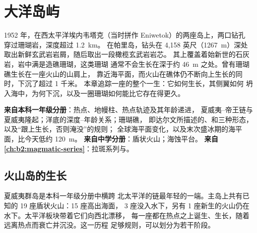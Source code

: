 \chapter{大洋岛屿}\label{ch:b2:oceanic-islands}

1952 年，在西太平洋埃内韦塔克（当时拼作 Eniwetok）的两座岛上，两口钻孔
穿过珊瑚岩，深度超过 \qty{1.2}{km}。
在帕里岛，钻头在 4,158 英尺（\qty{1267}{m}）深处取出新鲜玄武岩岩屑，随后取出一段橄榄玄武岩岩芯。
其上覆盖着始新世的石灰岩，岩中满是造礁珊瑚，这类珊瑚
通常不会生长在深于约 \qty{46}{m} 之处。曾有珊瑚礁生长在一座火山的山肩上，
靠近海平面，而火山在礁体仍不断向上生长的同时，下沉了超过 1 千米。
本章追踪一座的整个一生：它如何生长，其侧翼如何
坍入海中，为何下沉，以及一圈珊瑚如何能比它存在得更久。

\begin{recall}
\textbf{来自本科一年级分册}：热点、地幔柱、热点轨迹及其年龄递进，
夏威夷–帝王链与夏威夷隆起；洋底的深度–年龄关系；珊瑚礁，
即达尔文所描述的、和三种形态，以及“跟上生长，否则淹没”的规则；
全球海平面变化，以及末次盛冰期的海平面，比今天低约 \qty{120}{m}。
\textbf{来自中学分册}：盾状火山；海蚀平台。
\textbf{来自\cref{ch:b2:magmatic-series}}：拉斑系列与。
\end{recall}

\section{火山岛的生长}\label{sec:b2:oceanic-islands:growth}

夏威夷群岛是本科一年级分册中横跨
北太平洋的链最年轻的一端。主岛上共有已知的 19 座盾状火山：15 座高出海面，
3 座没入水下，另有 1 座新生的火山仍在水下。太平洋板块带着它们向西北漂移，
每一座都在热点之上诞生、生长，随着远离热点而衰亡并沉没。这一历程
足够规则，可以划分为若干阶段。

